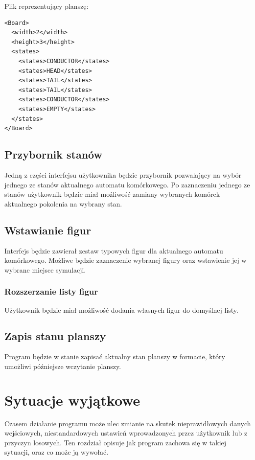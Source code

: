 \documentclass{report}
\begin{document}
\begin{samepage}
\noindent{}Plik reprezentujący planszę:
\begin{verbatim}
<Board>
  <width>2</width>
  <height>3</height>
  <states>
    <states>CONDUCTOR</states>
    <states>HEAD</states>
    <states>TAIL</states>
    <states>TAIL</states>
    <states>CONDUCTOR</states>
    <states>EMPTY</states>
  </states>
</Board>
\end{verbatim}
\end{samepage}


\section{Przybornik stanów}
Jedną z części interfejsu użytkownika będzie przybornik pozwalający na wybór jednego ze stanów aktualnego automatu komórkowego. Po zaznaczeniu jednego ze stanów użytkownik będzie miał możliwość zamiany wybranych komórek aktualnego pokolenia na wybrany stan.

\section{Wstawianie figur}
Interfejs będzie zawierał zestaw typowych figur dla aktualnego automatu komórkowego. Możliwe będzie zaznaczenie wybranej figury oraz wstawienie jej w wybrane miejsce symulacji.

\subsection{Rozszerzanie listy figur}
Użytkownik będzie miał możliwość dodania własnych figur do domyślnej listy.

\section{Zapis stanu planszy}
Program będzie w stanie zapisać aktualny stan planszy w formacie, który umożliwi późniejsze  wczytanie planszy.

\chapter{Sytuacje wyjątkowe}
Czasem działanie programu może ulec zmianie na skutek nieprawidłowych danych wejściowych, niestandardowych ustawień wprowadzonych przez użytkownik lub z przyczyn losowych. Ten rozdział opisuje jak program zachowa się w takiej sytuacji, oraz co może ją wywołać.
\end{document}
